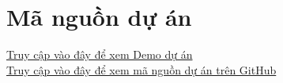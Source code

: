 \section{Mã nguồn dự án}
\href{https://drive.google.com/drive/folders/1G0LLb5vyW6NZmrRqkOVo3SLFaIsprbwf?usp=sharing}{Truy cập vào đây để xem Demo dự án} \\
\href{https://github.com/NghiaNguyenhk2005/DA251}{Truy cập vào đây để xem mã nguồn dự án trên GitHub}
